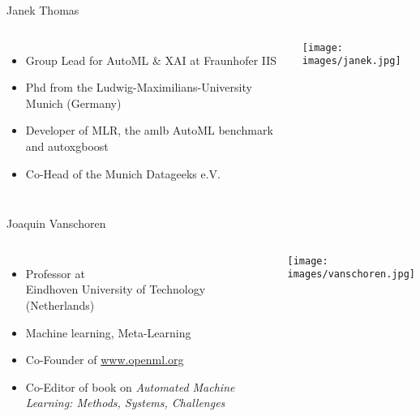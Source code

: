\begin{frame}[c]{Janek Thomas}

\begin{columns}


	\begin{itemize}
		\item Group Lead for AutoML \& XAI at Fraunhofer IIS
		\item Phd from the Ludwig-Maximilians-University Munich (Germany)
		\item Developer of MLR, the amlb AutoML benchmark and autoxgboost
        \item Co-Head of the Munich Datageeks e.V.
	\end{itemize}


	\texttt{[image: images/janek.jpg]}

\end{columns}

\end{frame}
\begin{frame}[c]{Joaquin Vanschoren}



\begin{columns}


	\begin{itemize}
		\item Professor at\\ Eindhoven University of Technology (Netherlands)
		\item Machine learning, Meta-Learning
		\item Co-Founder of \url{www.openml.org}
    	\item Co-Editor of book on \textit{Automated Machine Learning:	Methods, Systems, Challenges}
	\end{itemize}


	\texttt{[image: images/vanschoren.jpg]}

\end{columns}


\end{frame}
